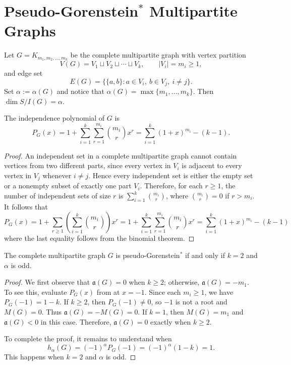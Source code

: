 \documentclass[12pt]{amsart}
\theoremstyle{plain}
\theoremstyle{definition}
\begin{document}
\section{Pseudo-Gorenstein$^{*}$ Multipartite Graphs}


Let $G=K_{m_1,m_2,\dots,m_k}$
be the complete multipartite graph with vertex partition
\[
V(G)=V_1\sqcup V_2\sqcup \cdots \sqcup V_k,
\qquad |V_i|=m_i \ge 1,
\]
and edge set
\[
E(G)=\{\{a,b\}: a\in V_i,\ b\in V_j,\ i\neq j\}.
\]
Set \(\alpha:=\alpha(G)\) and  notice that $\alpha (G)=\max\{m_1,\dots,m_k\}$. Then \(\dim S/I(G)=\alpha\).

\begin{lem}\label{lem:multu_indep_poly}
The independence polynomial of \(G\) is
    \[
    P_G(x)
    =
    1+\sum_{i=1}^k \sum_{r=1}^{m_i}\binom{m_i}{r}x^r
    =
    \sum_{i=1}^k (1+x)^{m_i}-(k-1).
    \]    
\end{lem}

\begin{proof}
An independent set in a complete multipartite graph cannot contain vertices
from two different parts, since every vertex in \(V_i\) is adjacent to every
vertex in \(V_j\) whenever \(i\neq j\). Hence every independent set is either
the empty set or a nonempty subset of exactly one part \(V_i\). Therefore, for each \(r\ge 1\), the number of independent sets of size  \(r\) is $\sum_{i=1}^k \binom{m_i}{r}$,
where \(\binom{m_i}{r}=0\) if \(r>m_i\). It follows that
\[
P_G(x)
=
1+\sum_{r\ge 1}\left(\sum_{i=1}^k \binom{m_i}{r}\right)x^r
=
1+\sum_{i=1}^k \sum_{r=1}^{m_i}\binom{m_i}{r}x^r=\sum_{i=1}^k(1+x)^{m_i}-(k-1)\]
where the last equality follows from the binomial theorem.
\end{proof}



\begin{cor}
The complete multipartite graph \(G\) is pseudo-Gorenstein\(^{*}\) if and only if
\(k=2\) and \(\alpha\) is odd.
\end{cor}

\begin{proof}
 We first observe that  $ \mathfrak a (G)=0$ when $k\ge 2$; otherwise, $\mathfrak a (G)=-m_1$. To see this, evaluate $P_G(x)$ from  at \(x=-1\). Since each \(m_i\ge 1\), we have \(P_G(-1)= 1-k\).  If \(k\ge 2\), then \(P_G(-1)\neq 0\), so \(-1\) is not a root and $M(G)=0$. Thus $\mathfrak a (G)=-M(G)=0$. If \(k=1\), then \(M(G)=m_1\) and $\mathfrak a (G)<0$ in this case.  Therefore,  $\mathfrak a (G)=0$ exactly when $k\geq 2$. 

To complete the proof, it remains to understand when  
\[
h_{\alpha}(G)=(-1)^{\alpha}P_G(-1)=(-1)^{\alpha}(1-k)=1.
\]
This happens when $k=2$ and $\alpha$ is odd.
\end{proof}
\end{document}
